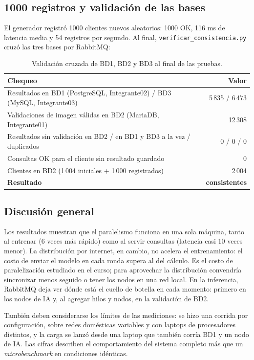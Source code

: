 \documentclass[10pt,a4paper]{article}
\begin{document}
\subsection{1000 registros y validación de las bases}

El generador registró 1000 clientes nuevos aleatorios: 1000 OK, 116 ms de latencia media y 54
registros por segundo. Al final, \texttt{verificar\_consistencia.py} cruzó las tres bases por RabbitMQ:

\begin{table}[H]
\centering
\small
\begin{tabularx}{\textwidth}{Yr}
\toprule
\textbf{Chequeo} & \textbf{Valor} \\
\midrule
Resultados en BD1 (PostgreSQL, Integrante02) / BD3 (MySQL, Integrante03) & 5\,835 / 6\,473 \\
Validaciones de imagen válidas en BD2 (MariaDB, Integrante01) & 12\,308 \\
Resultados sin validación en BD2 / en BD1 y BD3 a la vez / duplicados & 0 / 0 / 0 \\
Consultas OK para el cliente sin resultado guardado & 0 \\
Clientes en BD2 (1\,004 iniciales + 1\,000 registrados) & 2\,004 \\
\midrule
\textbf{Resultado} & \textbf{consistentes} \\
\bottomrule
\end{tabularx}
\caption{Validación cruzada de BD1, BD2 y BD3 al final de las pruebas.}
\label{tab:consistencia}
\end{table}

\subsection{Discusión general}

Los resultados muestran que el paralelismo funciona en una sola máquina, tanto al entrenar (6 veces
más rápido) como al servir consultas (latencia casi 10 veces menor). La distribución por internet, en
cambio, no acelera el entrenamiento: el costo de enviar el modelo en cada ronda supera al del cálculo.
Es el costo de paralelización estudiado en el curso; para aprovechar la distribución convendría
sincronizar menos seguido o tener los nodos en una red local. En la inferencia, RabbitMQ deja ver dónde
está el cuello de botella en cada momento: primero en los nodos de IA y, al agregar hilos y nodos, en la
validación de BD2.

También deben considerarse los límites de las mediciones: se hizo una corrida por configuración, sobre
redes domésticas variables y con laptops de procesadores distintos, y la carga se lanzó desde una laptop
que también corría BD1 y un nodo de IA. Las cifras describen el comportamiento del sistema completo más
que un \textit{microbenchmark} en condiciones idénticas.
\end{document}
